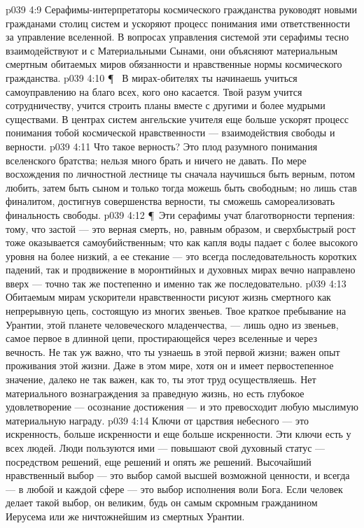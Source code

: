\vs p039 4:9 Серафимы\hyp{}интерпретаторы космического гражданства руководят новыми гражданами столиц систем и ускоряют процесс понимания ими ответственности за управление вселенной. В вопросах управления системой эти серафимы тесно взаимодействуют и с Материальными Сынами, они объясняют материальным смертным обитаемых миров обязанности и нравственные нормы космического гражданства.
\vs p039 4:10 \P\ \bibnobreakspace {} В мирах\hyp{}обителях ты начинаешь учиться самоуправлению на благо всех, кого оно касается. Твой разум учится сотрудничеству, учится строить планы вместе с другими и более мудрыми существами. В центрах систем ангельские учителя еще больше ускорят процесс понимания тобой космической нравственности --- взаимодействия свободы и верности.
\vs p039 4:11 Что такое верность? Это плод разумного понимания вселенского братства; нельзя много брать и ничего не давать. По мере восхождения по личностной лестнице ты сначала научишься быть верным, потом любить, затем быть сыном и только тогда можешь быть свободным; но лишь став финалитом, достигнув совершенства верности, ты сможешь самореализовать финальность свободы.
\vs p039 4:12 \P\ Эти серафимы учат благотворности терпения: тому, что застой --- это верная смерть, но, равным образом, и сверхбыстрый рост тоже оказывается самоубийственным; что как капля воды падает с более высокого уровня на более низкий, а ее стекание --- это всегда последовательность коротких падений, так и продвижение в моронтийных и духовных мирах вечно направлено вверх --- точно так же постепенно и именно так же последовательно.
\vs p039 4:13 Обитаемым мирам ускорители нравственности рисуют жизнь смертного как непрерывную цепь, состоящую из многих звеньев. Твое краткое пребывание на Урантии, этой планете человеческого младенчества, --- лишь одно из звеньев, самое первое в длинной цепи, простирающейся через вселенные и через вечность. Не так уж важно, что ты узнаешь в этой первой жизни; важен опыт проживания этой жизни. Даже  в этом мире, хотя он и имеет первостепенное значение, далеко не так важен, как то,  ты этот труд осуществляешь. Нет материального вознаграждения за праведную жизнь, но есть глубокое удовлетворение --- осознание достижения --- и это превосходит любую мыслимую материальную награду.
\vs p039 4:14 Ключи от царствия небесного --- это искренность, больше искренности и еще больше искренности. Эти ключи есть у всех людей. Люди пользуются ими --- повышают свой духовный статус --- посредством решений, еще решений и опять же решений. Высочайший нравственный выбор --- это выбор самой высшей возможной ценности, и всегда --- в любой и каждой сфере --- это выбор исполнения воли Бога. Если человек делает такой выбор, он  великим, будь он самым скромным гражданином Иерусема или же ничтожнейшим из смертных Урантии.
